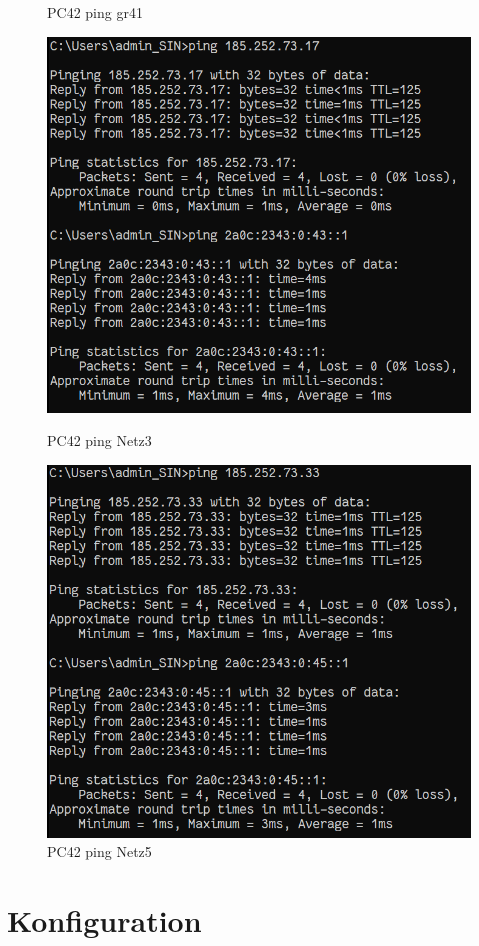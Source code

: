 \documentclass{article}
\begin{document}
\begin{figure}[!htp]
\begin{minipage}[b]{0.2\textwidth}
    \caption{PC42 ping gr41}
  \end{minipage}
  \hspace{0.8cm}
  \begin{minipage}[b]{0.2\textwidth}
    \includegraphics[width=\textwidth]{Arbeitsergebnisse/PC42/pc42_ping_net3.png}
    \caption{PC42 ping Netz3}
  \end{minipage}
  \hspace{0.8cm}
  \begin{minipage}[b]{0.2\textwidth}
    \includegraphics[width=\textwidth]{Arbeitsergebnisse/PC42/pc42_ping_net5.png}
    \caption{PC42 ping Netz5}
  \end{minipage}
\end{figure}



\section{Konfiguration}

% 
% 
\end{document}
